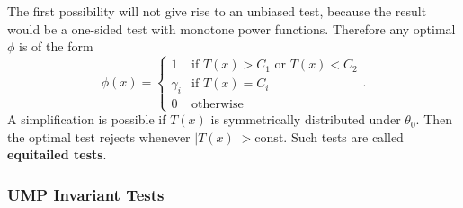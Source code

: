 The first possibility will not give rise to an unbiased test, because the result would be a one-sided test with monotone power functions. Therefore any optimal $\phi$ is of the form
\[
\phi(x) = \begin{cases} 1 & \text{if } T(x) > C_1 \text{ or } T(x) < C_2 \\ \gamma_i & \text{if } T(x) = C_i \\ 0 & \text{otherwise} \end{cases}.
\]
A simplification is possible if $T(x)$ is symmetrically distributed under $\theta_0$. Then the optimal test rejects whenever $|T(x)| > \text{const}$. Such tests are called \textbf{equitailed tests}.

\subsubsection{UMP Invariant Tests}
